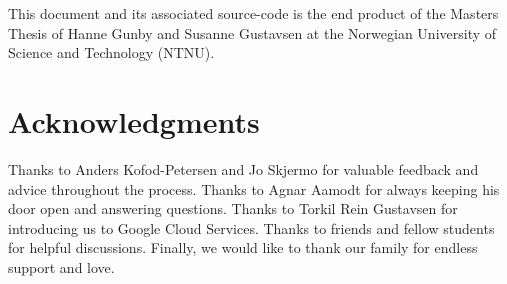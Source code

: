 
This document and its associated source-code is the end product of the Masters Thesis of Hanne Gunby and Susanne Gustavsen at the Norwegian University of Science and Technology (NTNU). 


\section*{Acknowledgments}

Thanks to Anders Kofod-Petersen and Jo Skjermo for valuable feedback and advice throughout the process.
\newline
\newline
Thanks to Agnar Aamodt for always keeping his door open and answering questions.
\newline
\newline
Thanks to Torkil Rein Gustavsen for introducing us to Google Cloud Services.
\newline
\newline
Thanks to friends and fellow students for helpful discussions.
\newline
\newline
Finally, we would like to thank our family for endless support and love.